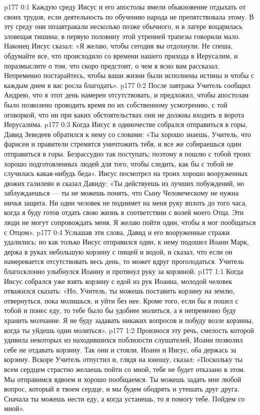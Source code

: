 \author{Комиссия срединников}
\vs p177 0:1 Каждую среду Иисус и его апостолы имели обыкновение отдыхать от своих трудов, если деятельность по обучению народа не препятствовала этому. В эту среду они позавтракали несколько позже обычного, и в лагере воцарилась зловещая тишина; в первую половину этой утренней трапезы говорили мало. Наконец Иисус сказал: «Я желаю, чтобы сегодня вы отдохнули. Не спеша, обдумайте все, что происходило со времени нашего прихода в Иерусалим, и поразмыслите о том, что скоро предстоит, о чем я ясно вам рассказал. Непременно постарайтесь, чтобы ваши жизни были исполнены истины и чтобы с каждым днем в вас росла благодать».
\vs p177 0:2 После завтрака Учитель сообщил Андрею, что в этот день намерен отсутствовать, и предложил, чтобы апостолам было позволено проводить время по их собственному усмотрению, с той оговоркой, что ни при каких обстоятельствах они не должны входить в ворота Иерусалима.
\vs p177 0:3 Когда Иисус в одиночестве собрался отправиться в горы, Давид Зеведеев обратился к нему со словами: «Ты хорошо знаешь, Учитель, что фарисеи и правители стремятся уничтожить тебя, и все же собираешься один отправиться в горы. Безрассудно так поступать; поэтому я пошлю с тобой троих хорошо подготовленных людей для того, чтобы следить, как бы с тобой не случилась какая\hyp{}нибудь беда». Иисус посмотрел на троих хорошо вооруженных дюжих галилеян и сказал Давиду: «Ты действуешь из лучших побуждений, но заблуждаешься --- ты не можешь понять, что Сыну Человеческому не нужна ничья защита. Ни один человек не поднимет на меня руку вплоть до того часа, когда я буду готов отдать свою жизнь в соответствии с волей моего Отца. Эти люди не могут сопровождать меня. Я желаю пойти один, чтобы я мог пообщаться с Отцом».
\vs p177 0:4 Услышав эти слова, Давид и его вооруженные стражи удалились; но как только Иисус отправился один, к нему подошел Иоанн Марк, держа в руках небольшую корзину с пищей и водой, и сказал, что если он намеревается отсутствовать весь день, то может вдруг проголодаться. Учитель благосклонно улыбнулся Иоанну и протянул руку за корзиной.
\vs p177 1:1 Когда Иисус собрался уже взять корзину с едой из рук Иоанна, молодой человек отважился сказать: «Но, Учитель, ты можешь поставить корзину на землю, отвернуться, пока молишься, и уйти без нее. Кроме того, если бы я пошел с тобой и понес еду, то тебе было бы удобнее молиться, а я непременно буду хранить молчание. Я не буду задавать никаких вопросов и побуду возле корзины, когда ты уйдешь один молиться».
\vs p177 1:2 Произнося эту речь, смелость которой удивила некоторых из находившихся поблизости слушателей, Иоанн позволил себе не отдавать корзину. Так они и стояли, Иоанн и Иисус, оба держась за корзину. Вскоре Учитель отпустил и, глядя на юношу, сказал: «Поскольку ты всем сердцем страстно желаешь пойти со мной, тебе не будет отказано в этом. Мы отправимся вдвоем и хорошо пообщаемся. Ты можешь задать мне любой вопрос, который в твоем сердце, и мы будем ободрять и утешать друг друга. Сначала ты можешь нести еду, а когда устанешь, то я помогу тебе. Пойдем со мной».
